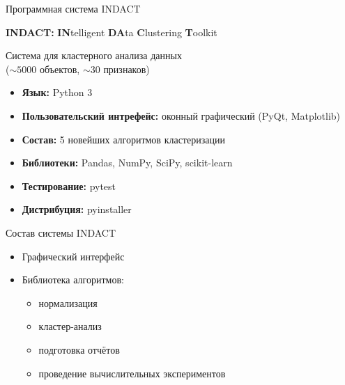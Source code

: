 \documentclass[aspectratio=169,tikz]{beamer}
\newcommand{\sitem}{\item[$ \ast $]}
\begin{document}
	\begin{frame}[t]{Программная система INDACT}
	\vspace{-0.1cm}
	\begin{center}
		\LARGE  \textbf{INDACT:}
		{ \textbf{IN}telligent \textbf{DA}ta \textbf{C}lustering \textbf{T}oolkit\\}
	\end{center}
	\vspace{0.1cm}
	\normalsize
	Система для кластерного анализа данных\\
	($ \sim 5000 $ объектов, $ \sim 30 $ признаков)
	\begin{itemize}
		\item \textbf{Язык:} Python 3
		\item \textbf{Пользовательский интрефейс:} оконный графический (PyQt, Matplotlib)
		\item \textbf{Состав:} 5 новейших алгоритмов кластеризации
		\item \textbf{Библиотеки:} Pandas, NumPy, SciPy, scikit-learn 
		\item \textbf{Тестирование:} pytest
		\item \textbf{Дистрибуция:} pyinstaller
	\end{itemize}
	\end{frame}
	
	\begin{frame}{Состав системы INDACT}
	\begin{itemize}
		\item Графический интерфейс
		\item Библиотека алгоритмов:
		\begin{itemize}
			\sitem нормализация
			\sitem кластер-анализ
			\sitem подготовка отчётов
			\sitem проведение вычислительных экспериментов
		\end{itemize}
		
	\end{itemize}
	\end{frame}
	
\end{document}
